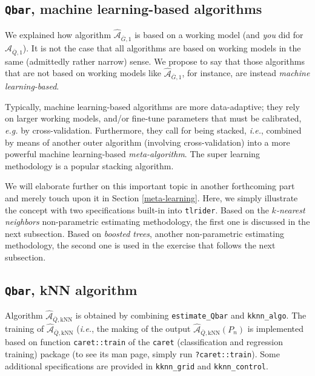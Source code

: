 \documentclass[11pt,openright,twoside]{book}
\newcommand{\Algo}{\widehat{\mathcal{A}}}
\newcommand{\Gbar}{\bar{G}}
\newcommand{\Qbar}{\bar{Q}}
\theoremstyle{definition}
\theoremstyle{definition}
\theoremstyle{definition}
\theoremstyle{remark}
\begin{document}
\hypertarget{qbar-machine-learning-based-algorithms}{%
\subsection{\texorpdfstring{\texttt{Qbar}, machine learning-based algorithms}{Qbar, machine learning-based algorithms}}\label{qbar-machine-learning-based-algorithms}}


We explained how algorithm \(\Algo_{\Gbar,1}\) is based on a working model (and
\emph{you} did for \(\Algo_{\Qbar,1}\)). It is not the case that all algorithms are
based on working models in the same (admittedly rather narrow) sense. We
propose to say that those algorithms that are not based on working models like
\(\Algo_{\Gbar,1}\), for instance, are instead \emph{machine learning-based}.

Typically, machine learning-based algorithms are more data-adaptive; they rely
on larger working models, and/or fine-tune parameters that must be calibrated,
\emph{e.g.} by cross-validation. Furthermore,
they call for being stacked,
\emph{i.e.}, combined by means of another outer algorithm (involving
cross-validation) into a more powerful machine learning-based
\emph{meta-algorithm}. The super
learning methodology is a
popular stacking algorithm.

We will elaborate further on this important topic in another forthcoming part
and merely touch upon it in Section \ref{meta-learning}. Here, we simply
illustrate the concept with two specifications built-in into \texttt{tlrider}. Based
on the \emph{\(k\)-nearest neighbors} non-parametric estimating methodology, the
first one is discussed in the next subsection. Based on \emph{boosted trees},
another non-parametric estimating methodology, the second one is used in the
exercise that follows the next subsection.

\hypertarget{Qbar-knn-algo}{%
\subsection{\texorpdfstring{\texttt{Qbar}, kNN algorithm}{Qbar, kNN algorithm}}\label{Qbar-knn-algo}}

Algorithm \(\Algo_{\Qbar,\text{kNN}}\) is obtained by combining \texttt{estimate\_Qbar}
and \texttt{kknn\_algo}. The training of \(\Algo_{\Qbar,\text{kNN}}\) (\emph{i.e.}, the
making of the output \(\Algo_{\Qbar,\text{kNN}} (P_{n})\) is implemented based
on function \texttt{caret::train} of the \texttt{caret} (classification and regression
training) package (to see its man page, simply run \texttt{?caret::train}). Some
additional specifications are provided in \texttt{kknn\_grid} and \texttt{kknn\_control}.
\end{document}
